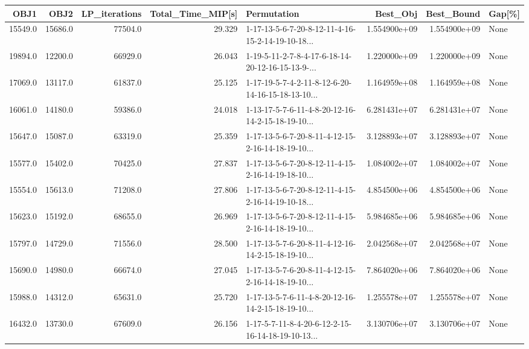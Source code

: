 \begin{tabular}{rrrrlrrl}
\toprule
    OBJ1 &     OBJ2 &  LP\_iterations &  Total\_Time\_MIP[s] &                                        Permutation &      Best\_Obj &    Best\_Bound & Gap[\%] \\
\midrule
 15549.0 &  15686.0 &        77504.0 &             29.329 &  1-17-13-5-6-7-20-8-12-11-4-16-15-2-14-19-10-18... &  1.554900e+09 &  1.554900e+09 &   None \\
 19894.0 &  12200.0 &        66929.0 &             26.043 &  1-19-5-11-2-7-8-4-17-6-18-14-20-12-16-15-13-9-... &  1.220000e+09 &  1.220000e+09 &   None \\
 17069.0 &  13117.0 &        61837.0 &             25.125 &  1-17-19-5-7-4-2-11-8-12-6-20-14-16-15-18-13-10... &  1.164959e+08 &  1.164959e+08 &   None \\
 16061.0 &  14180.0 &        59386.0 &             24.018 &  1-13-17-5-7-6-11-4-8-20-12-16-14-2-15-18-19-10... &  6.281431e+07 &  6.281431e+07 &   None \\
 15647.0 &  15087.0 &        63319.0 &             25.359 &  1-17-13-5-6-7-20-8-11-4-12-15-2-16-14-18-19-10... &  3.128893e+07 &  3.128893e+07 &   None \\
 15577.0 &  15402.0 &        70425.0 &             27.837 &  1-17-13-5-6-7-20-8-12-11-4-15-2-16-14-19-18-10... &  1.084002e+07 &  1.084002e+07 &   None \\
 15554.0 &  15613.0 &        71208.0 &             27.806 &  1-17-13-5-6-7-20-8-12-11-4-15-2-16-14-19-10-18... &  4.854500e+06 &  4.854500e+06 &   None \\
 15623.0 &  15192.0 &        68655.0 &             26.969 &  1-17-13-5-6-7-20-8-12-11-4-15-2-16-14-18-19-10... &  5.984685e+06 &  5.984685e+06 &   None \\
 15797.0 &  14729.0 &        71556.0 &             28.500 &  1-17-13-5-7-6-20-8-11-4-12-16-14-2-15-18-19-10... &  2.042568e+07 &  2.042568e+07 &   None \\
 15690.0 &  14980.0 &        66674.0 &             27.045 &  1-17-13-5-7-6-20-8-11-4-12-15-2-16-14-18-19-10... &  7.864020e+06 &  7.864020e+06 &   None \\
 15988.0 &  14312.0 &        65631.0 &             25.720 &  1-17-13-5-7-6-11-4-8-20-12-16-14-2-15-18-19-10... &  1.255578e+07 &  1.255578e+07 &   None \\
 16432.0 &  13730.0 &        67609.0 &             26.156 &  1-17-5-7-11-8-4-20-6-12-2-15-16-14-18-19-10-13... &  3.130706e+07 &  3.130706e+07 &   None \\

\end{tabular}

